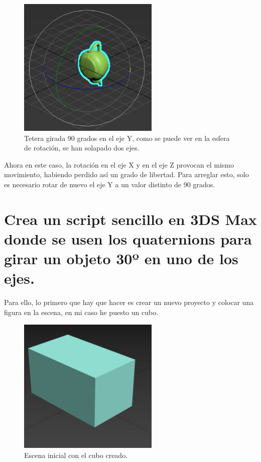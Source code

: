 \documentclass{article}
\begin{document}
\begin{figure}[H]
    \centering
    \includegraphics[width=0.6\textwidth]{imagenes/6-3.png}
    \caption{Tetera girada 90 grados en el eje Y, como se puede ver en la esfera de rotación, se han solapado dos ejes.}
\end{figure}

Ahora en este caso, la rotación en el eje X y en el eje Z provocan el mismo movimiento, habiendo perdido así un grado de libertad. Para arreglar esto, solo es necesario rotar de nuevo el eje Y a un valor distinto de 90 grados.

\newpage
\section{Crea un script sencillo en 3DS Max donde se usen los quaternions para girar un objeto 30º en uno de los ejes.}

Para ello, lo primero que hay que hacer es crear un nuevo proyecto y colocar una figura en la escena, en mi caso he puesto un cubo.

\begin{figure}[H]
    \centering
    \includegraphics[width=0.6\textwidth]{imagenes/7-1.png}
    \caption{Escena inicial con el cubo creado.}
\end{figure}
\end{document}
